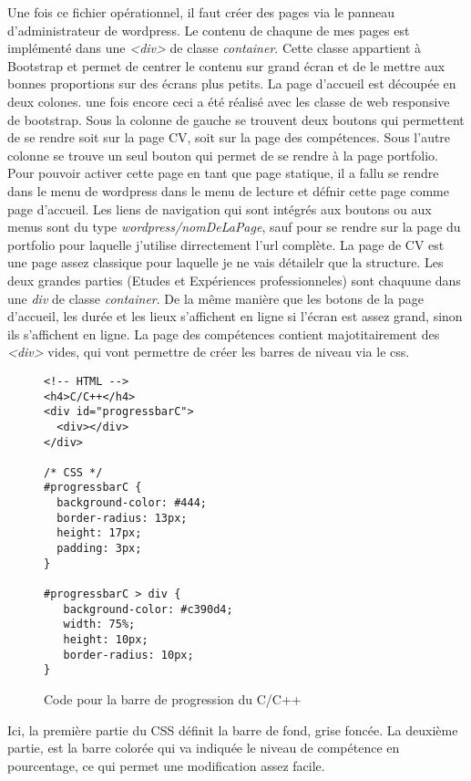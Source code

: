 \documentclass{article}
\begin{document}
Une fois ce fichier opérationnel, il faut créer des pages via le panneau d'administrateur de wordpress. Le contenu de chaqune de mes pages est implémenté dans une \textit{<div>} de classe \textit{container}. Cette classe appartient à Bootstrap et permet de centrer le contenu sur grand écran et de le mettre aux bonnes proportions sur des écrans plus petits.
\newline La page d'accueil est découpée en deux colones. une fois encore ceci a été réalisé avec les classe de web responsive de bootstrap. Sous la colonne de gauche se trouvent deux boutons qui permettent de se rendre soit sur la page CV, soit sur la page des compétences. Sous l'autre colonne se trouve un seul bouton qui permet de se rendre à la page portfolio. Pour pouvoir activer cette page en tant que page statique, il a fallu se rendre dans le menu de wordpress dans le menu de lecture et défnir cette page comme page d'accueil.  Les liens de navigation qui sont intégrés aux boutons ou aux menus sont du type \textit{wordpress/nomDeLaPage}, sauf pour se rendre sur la page du portfolio pour laquelle j'utilise dirrectement l'url complète.
\newline La page de CV est une page assez classique pour laquelle je ne vais détailelr que la structure. Les deux grandes parties (Etudes et Expériences professionneles) sont chaquune dans une \textit{div} de classe \textit{container}. De la même manière que les botons de la page d'accueil, les durée et les lieux s'affichent en ligne si l'écran est assez grand, sinon ils s'affichent en ligne.
\newline La page des compétences contient majotitairement des \textit{<div>} vides, qui vont permettre de créer les barres de niveau via le css.

\begin{figure}
\begin{Verbatim}
<!-- HTML -->
<h4>C/C++</h4>
<div id="progressbarC">
  <div></div>
</div>

/* CSS */
#progressbarC {
  background-color: #444;
  border-radius: 13px;
  height: 17px;
  padding: 3px;
}

#progressbarC > div {
   background-color: #c390d4;
   width: 75%;
   height: 10px;
   border-radius: 10px;
}

\end{Verbatim}
\caption{Code pour la barre de progression du C/C++}
\end{figure}

Ici, la première partie du CSS définit la barre de fond, grise foncée. La deuxième partie, est la barre colorée qui va indiquée le niveau de compétence en pourcentage, ce qui permet une modification assez facile.
\end{document}
